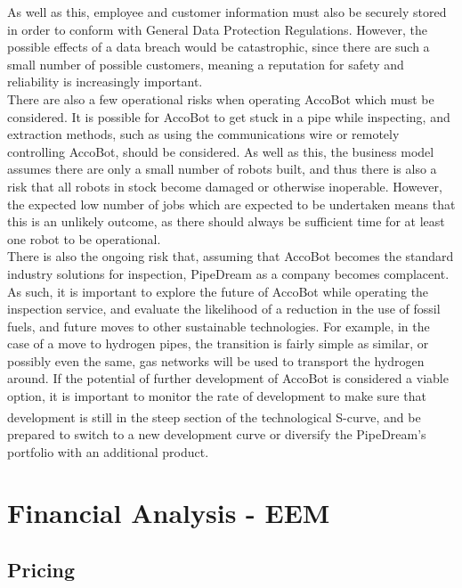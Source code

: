 \documentclass[11pt]{article}		%
\newcommand{\supercite}[1]{\textsuperscript{\cite{#1}}}		%
\begin{document}
     	As well as this, employee and customer information must also be securely stored in order to conform with General Data Protection Regulations.
     	However, the possible effects of a data breach would be catastrophic, since there are such a small number of possible customers, meaning a reputation for safety and reliability is increasingly important.
     	\\
     	There are also a few operational risks when operating AccoBot which must be considered.
     	It is possible for AccoBot to get stuck in a pipe while inspecting, and extraction methods, such as using the communications wire or remotely controlling AccoBot, should be considered.
     	As well as this, the business model assumes there are only a small number of robots built, and thus there is also a risk that all robots in stock become damaged or otherwise inoperable.
     	However, the expected low number of jobs which are expected to be undertaken means that this is an unlikely outcome, as there should always be sufficient time for at least one robot to be operational.
     	\\
     	There is also the ongoing risk that, assuming that AccoBot becomes the standard industry solutions for inspection, PipeDream as a company becomes complacent.
     	As such, it is important to explore the future of AccoBot while operating the inspection service, and evaluate the likelihood of a reduction in the use of fossil fuels, and future moves to other sustainable technologies.
     	For example, in the case of a move to hydrogen pipes, the transition is fairly simple as similar, or possibly even the same, gas networks will be used to transport the hydrogen around.
     	If the potential of further development of AccoBot is considered a viable option, it is important to monitor the rate of development to make sure that development is still in the steep section of the technological S-curve\supercite{christensen1998innovation}, and be prepared to switch to a new development curve or diversify the PipeDream's portfolio with an additional product.
     	
 	\section{Financial Analysis - EEM}
	 
	 
        \subsection{Pricing}
            
\end{document}

